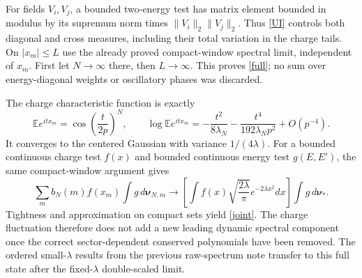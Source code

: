 \documentclass[11pt,a4paper]{article}
\newcommand{\EE}{\mathbb E}
\begin{document}
For fields $V_i,V_j$, a bounded two-energy test has matrix element
bounded in modulus by its supremum norm times
$\|V_i\|_2\|V_j\|_2$. Thus \eqref{UI} controls both diagonal and
cross measures, including their total variation in the charge tails.
On $|x_m|\le L$ use the already proved compact-window spectral
limit, independent of $x_m$. First let $N\to\infty$ there,
then $L\to\infty$. This proves \eqref{full}; no sum over
energy-diagonal weights or oscillatory phases was discarded.

The charge characteristic function is exactly
\begin{equation}
 \EE e^{itx_m}=\cos\!\left(\frac{t}{2p}\right)^N,
 \qquad \log\EE e^{itx_m}
 =-\frac{t^2}{8\lambda_N}-\frac{t^4}{192\lambda_Np^2}
   +O(p^{-4}).
\end{equation}
It converges to the centered Gaussian with variance $1/(4\lambda)$.
For a bounded continuous charge test $f(x)$ and bounded continuous
energy test $g(E,E')$, the same compact-window argument gives
\begin{equation}
 \sum_m b_N(m)f(x_m)\int g\,d\boldsymbol\nu_{N,m}
 \longrightarrow
 \left[\int f(x)\sqrt{\frac{2\lambda}{\pi}}e^{-2\lambda x^2}dx\right]
 \int g\,d\boldsymbol\nu_* .
\end{equation}
Tightness and approximation on compact sets yield \eqref{joint}.
The charge fluctuation therefore does not add a new leading
dynamic spectral component once the correct sector-dependent
conserved polynomials have been removed. The ordered small-$\lambda$
results from the previous raw-spectrum note transfer to this full
state after the fixed-$\lambda$ double-scaled limit.

\newpage
\end{document}

